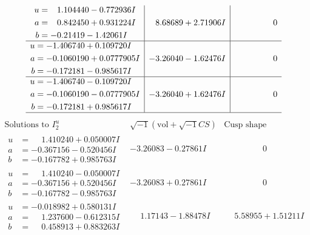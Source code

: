 \documentclass[1p]{elsarticle_modified}
\theoremstyle{definition}
\newcommand{\I}{\sqrt{-1}}
\begin{document}
$$\begin{array}{c|c|c}
\begin{aligned}
u &= \phantom{-}1.104440 - 0.772936 I \\
a &= \phantom{-}0.842450 + 0.931224 I \\
b &= -0.21419 - 1.42061 I\end{aligned}
 & \phantom{-}8.68689 + 2.71906 I & \phantom{-0.000000 } 0 \\ \hline\begin{aligned}
u &= -1.406740 + 0.109720 I \\
a &= -0.1060190 + 0.0777905 I \\
b &= -0.172181 - 0.985617 I\end{aligned}
 & -3.26040 - 1.62476 I & \phantom{-0.000000 } 0 \\ \hline\begin{aligned}
u &= -1.406740 - 0.109720 I \\
a &= -0.1060190 - 0.0777905 I \\
b &= -0.172181 + 0.985617 I\end{aligned}
 & -3.26040 + 1.62476 I & \phantom{-0.000000 } 0\\
 \hline 
 \end{array}$$\newpage$$\begin{array}{c|c|c}  
\text{Solutions to }I^u_{2}& \I (\text{vol} + \sqrt{-1}CS) & \text{Cusp shape}\\
 \hline 
\begin{aligned}
u &= \phantom{-}1.410240 + 0.050007 I \\
a &= -0.367156 - 0.520456 I \\
b &= -0.167782 + 0.985763 I\end{aligned}
 & -3.26083 - 0.27861 I & \phantom{-0.000000 } 0 \\ \hline\begin{aligned}
u &= \phantom{-}1.410240 - 0.050007 I \\
a &= -0.367156 + 0.520456 I \\
b &= -0.167782 - 0.985763 I\end{aligned}
 & -3.26083 + 0.27861 I & \phantom{-0.000000 } 0 \\ \hline\begin{aligned}
u &= -0.018982 + 0.580131 I \\
a &= \phantom{-}1.237600 - 0.612315 I \\
b &= \phantom{-}0.458913 + 0.883263 I\end{aligned}
 & \phantom{-}1.17143 - 1.88478 I & \phantom{-}5.58955 + 1.51211 I \\ \hline\begin{aligned}

\end{aligned}
\end{array}$$
\end{document}
